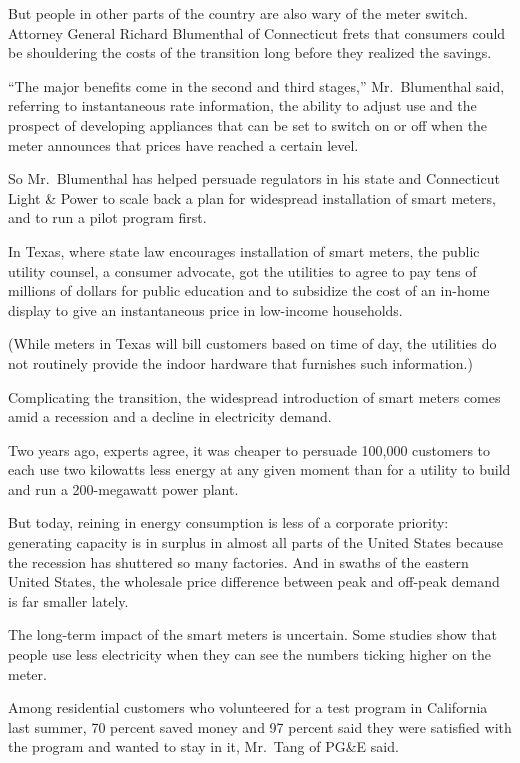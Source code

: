 ﻿\documentclass[12pt]{article}
\begin{document}
But people in other parts of the country are also wary of the meter switch. Attorney General Richard
Blumenthal of Connecticut frets that consumers could be shouldering the costs of the transition long
before they realized the savings.

``The major benefits come in the second and third stages,'' Mr.~Blumenthal said, referring to
instantaneous rate information, the ability to adjust use and the prospect of developing appliances
that can be set to switch on or off when the meter announces that prices have reached a certain
level.

So Mr.~Blumenthal has helped persuade regulators in his state and Connecticut Light \& Power to
scale back a plan for widespread installation of smart meters, and to run a pilot program first.

In Texas, where state law encourages installation of smart meters, the public utility counsel, a
consumer advocate, got the utilities to agree to pay tens of millions of dollars for public
education and to subsidize the cost of an in-home display to give an instantaneous price in
low-income households.

(While meters in Texas will bill customers based on time of day, the utilities do not routinely
provide the indoor hardware that furnishes such information.)

Complicating the transition, the widespread introduction of smart meters comes amid a recession and
a decline in electricity demand.

Two years ago, experts agree, it was cheaper to persuade 100,000 customers to each use two kilowatts
less energy at any given moment than for a utility to build and run a 200-megawatt power plant.

But today, reining in energy consumption is less of a corporate priority: generating capacity is in
surplus in almost all parts of the United States because the recession has shuttered so many
factories. And in swaths of the eastern United States, the wholesale price difference between peak
and off-peak demand is far smaller lately.

The long-term impact of the smart meters is uncertain. Some studies show that people use less
electricity when they can see the numbers ticking higher on the meter.

Among residential customers who volunteered for a test program in California last summer, 70 percent
saved money and 97 percent said they were satisfied with the program and wanted to stay in it,
Mr.~Tang of PG\&E said.
\end{document}
